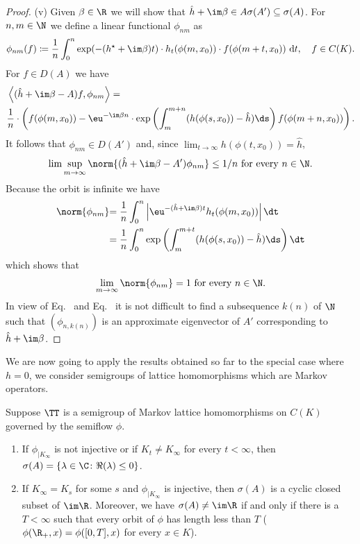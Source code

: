\begin{proof}
    (v) Given $\beta \in \R$ we will show that $\hat{h} + \im\beta \in A\sigma(A') \subseteq \sigma(A)$.
    For $n,m \in \N$ we define a linear functional $\phi_{nm}$ as 
\[  
		\phi_{nm}(f) \coloneq \frac{1}{n}\int_{0}^{n} \exp(-(h^{\star}+\im\beta )t)\cdot h_{t}(\phi(m,x_{0}))\cdot f(\phi(m+t,x_{0})) \text{ d}t, \quad f\in C(K).
\]
For $f \in D(A)$ we have 
	\begin{align*}
	&\left\langle(\hat{h}+\im\beta -A)f,\phi_{nm}\right\rangle = \\
	&  \frac{1}{n}\cdot\left(f(\phi(m,x_{0})) - \eu^{-\im\beta  n}\cdot %
	\exp\left(\int_{m}^{m+n} (h(\phi(s,x_{0}))-\hat{h})\ds \right)f(\phi(m+n,x_{0}))\right).
	\end{align*}
It follows that $\phi_{nm} \in D(A')$ and, since $\lim_{t\to\infty} h(\phi(t,x_{0})) = \hat{h}$,
\begin{equation}\label{eq:b3-4.13}
	\lim \sup_{m\to\infty} \norm{(\hat{h}+\im\beta -A')\phi_{nm}} \leq 1/n \text{ for every } n \in \N.
\end{equation}
Because the orbit is infinite we have
	\begin{align*}
	\norm{\phi_{nm}} & {= \frac{1}{n}\int_{0}^{n} \left|\eu^{-(\hat{h}+\im\beta )t} h_{t}(\phi(m,x_{0}))\right| \dt} \\
	& {= \frac{1}{n}\int_{0}^{n} \exp\left(\int_{m}^{m+t} (h(\phi(s,x_{0}))-\hat{h})\ds \right)\dt}
	\end{align*}
which shows that
\begin{equation}\label{eq:b3-4.14}
	\lim_{m\to\infty} \norm{\phi_{nm}} = 1 \text{ for every } n \in \N.
\end{equation}
In view of Eq.~ and Eq.~ it is not difficult to find a subsequence $k(n)$ of\/ $\N$ such that $(\phi_{n,k(n)})$ is an approximate eigenvector of\/ $A'$ corresponding to $\hat{h} + \im\beta$.
\end{proof}
We are now going to apply the results obtained so far to the special case where $h = 0$, \ie we consider semigroups of lattice homomorphisms which are Markov operators.
\begin{theorem}\label{thm:b3-4.9}
	Suppose $\TT$ is a semigroup of Markov lattice homomorphisms on $C(K)$ governed by the semiflow $\phi$.
	\begin{enumerate}[\upshape (i)]
		\item 
		If\/ $\phi_{|K_{\infty}}$ is not injective or if\/ $K_{t} \neq K_{\infty}$ for every $t < \infty$, then $\sigma(A) = \{\lambda \in \C \colon \Re(\lambda) \leq 0\}$.
		
		\item 
		If\/ $K_{\infty} = K_{s}$ for some $s$ and $\phi_{|K_{\infty}}$ is injective, then $\sigma(A)$ is a cyclic closed subset of\/ $\im \R$.
		Moreover, we have $\sigma(A) \neq \im\R$ if and only if there is a $T < \infty$ such that every orbit of\/ $\phi$ has length less than $T$ (\ie $\phi(\R_{+},x) = \phi([0,T],x)$ for every $x \in K$).
	\end{enumerate}
\end{theorem}
